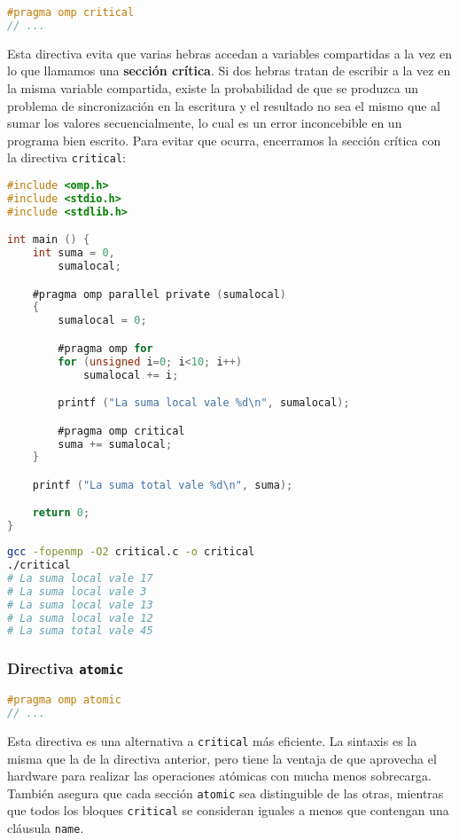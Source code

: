 \begin{lstlisting}[language=C]
#pragma omp critical
// ...
\end{lstlisting}

Esta directiva evita que varias hebras accedan a variables compartidas a la vez en lo que llamamos una \textbf{sección crítica}.
Si dos hebras tratan de escribir a la vez en la misma variable compartida, existe la probabilidad de que se produzca un problema de sincronización en la escritura y el resultado no sea el mismo que al sumar los valores secuencialmente, lo cual es un error inconcebible en un programa bien escrito.
Para evitar que ocurra, encerramos la sección crítica con la directiva \texttt{critical}:

\begin{lstlisting}[language=C]
#include <omp.h>
#include <stdio.h>
#include <stdlib.h>

int main () {
	int suma = 0,
	    sumalocal;

	#pragma omp parallel private (sumalocal)
	{
		sumalocal = 0;

		#pragma omp for
		for (unsigned i=0; i<10; i++)
			sumalocal += i;

		printf ("La suma local vale %d\n", sumalocal);

		#pragma omp critical
		suma += sumalocal;
	}

	printf ("La suma total vale %d\n", suma);

	return 0;
}
\end{lstlisting}

\begin{lstlisting}[language=sh]
gcc -fopenmp -O2 critical.c -o critical
./critical
# La suma local vale 17
# La suma local vale 3
# La suma local vale 13
# La suma local vale 12
# La suma total vale 45
\end{lstlisting}

\subsubsection{Directiva \texttt{atomic}}

\begin{lstlisting}[language=C]
#pragma omp atomic
// ...
\end{lstlisting}

Esta directiva es una alternativa a \texttt{critical} más eficiente.
La sintaxis es la misma que la de la directiva anterior, pero tiene la ventaja de que aprovecha el hardware para realizar las operaciones atómicas con mucha menos sobrecarga.
También asegura que cada sección \texttt{atomic} sea distinguible de las otras, mientras que todos los bloques \texttt{critical} se consideran iguales a menos que contengan una cláusula \texttt{name}.


